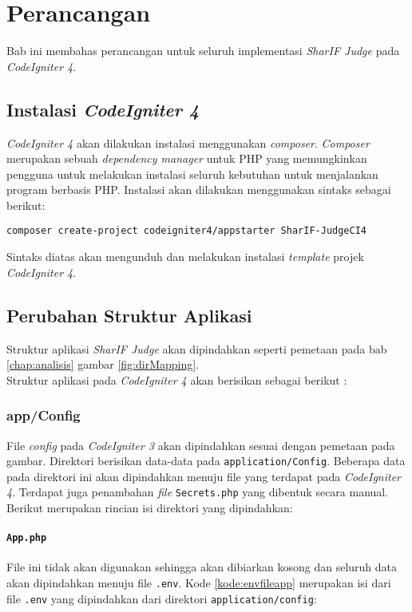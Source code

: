 \chapter{Perancangan}
\label{chap:perancangan}
Bab ini membahas perancangan untuk seluruh implementasi \textit{SharIF Judge} pada \textit{CodeIgniter 4}.

\section{Instalasi \textit{CodeIgniter 4}}
\textit{CodeIgniter 4} akan dilakukan instalasi menggunakan \textit{composer}. \textit{Composer} merupakan sebuah \textit{dependency manager} untuk PHP yang memungkinkan pengguna untuk melakukan instalasi seluruh kebutuhan untuk menjalankan program berbasis PHP. Instalasi akan dilakukan menggunakan sintaks sebagai berikut:

\begin{center}
\verb|composer create-project codeigniter4/appstarter SharIF-JudgeCI4|
\end{center}

Sintaks diatas akan mengunduh dan melakukan instalasi \textit{template} projek \textit{CodeIgniter 4}.

\section{Perubahan Struktur Aplikasi}
\label{sec:perubahanStruktur}
Struktur aplikasi \textit{SharIF Judge} akan dipindahkan seperti pemetaan pada bab \ref{chap:analisis} gambar \ref{fig:dirMapping}. 
\\
Struktur aplikasi pada \textit{CodeIgniter 4} akan berisikan sebagai berikut :
\subsection{app/Config}
File \textit{config} pada \textit{CodeIgniter 3} akan dipindahkan sesuai dengan pemetaan pada gambar. Direktori berisikan data-data pada \texttt{application/Config}. Beberapa data pada direktori ini akan dipindahkan menuju file yang terdapat pada \textit{CodeIgniter 4}. Terdapat juga penambahan \textit{file} \texttt{Secrets.php} yang dibentuk secara manual. Berikut merupakan rincian isi direktori yang dipindahkan:
\subsubsection{\texttt{App.php}}
File ini tidak akan digunakan sehingga akan dibiarkan kosong dan seluruh data akan dipindahkan menuju file \texttt{.env}. Kode \ref{kode:envfileapp} merupakan isi dari file \texttt{.env} yang dipindahkan dari direktori \texttt{application/config}:

